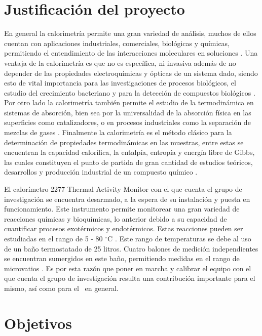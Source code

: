 \section{Justificación del proyecto}
	En general la calorimetría permite una gran variedad de análisis, muchos de ellos cuentan con aplicaciones industriales, comerciales, biológicas y químicas, permitiendo el entendimiento de las interacciones moleculares en soluciones \cite{blandamer1998titration}. Una ventaja de la calorimetría es que no es específica, ni invasiva además de no depender de las propiedades electroquímicas y ópticas de un sistema dado, siendo esto de vital importancia para las investigaciones de procesos biológicos, el estudio del crecimiento bacteriano y para la detección de compuestos biológicos \cite{winkelmann2004application}. Por otro lado la calorimetría también permite el estudio de la termodinámica en sistemas de absorción, bien sea por la universalidad de la absorción física en las superficies como catalizadores, o en procesos industriales como la separación de mezclas de gases \cite{morrison1987calorimetry}. Finalmente la calorimetría es el método clásico para la determinación de propiedades termodinámicas en las muestras, entre estas se encuentran la capacidad calorífica, la entalpía, entropía y energía libre de Gibbs, las cuales constituyen el punto de partida de gran cantidad de estudios teóricos, desarrollos y producción industrial de un compuesto químico \cite{wang2005determination, gaisford2016principles}.
	
	El calorímetro 2277 Thermal Activity Monitor con el que cuenta el grupo de investigación se encuentra desarmado, a la espera de su instalaci\'on y puesta en funcionamiento. Este instrumento permite monitorear una gran variedad de reacciones químicas y bioquímicas, lo anterior debido a su capacidad de cuantificar procesos exotérmicos y endotérmicos. Estas reacciones pueden ser estudiadas en el rango de 5 - 80 $^\circ$C \cite{Suurkuusk}. Este rango de temperaturas se debe al uso de un baño termostatado de 25 litros. Cuatro balones de medición independientes se encuentran sumergidos en este baño, permitiendo medidas en el rango de microvatios \cite{Suurkuusk}. Es por esta razón que poner en marcha y calibrar el equipo con el que cuenta el grupo de investigación resulta una contribución importante para el mismo, así como para el \deptname\ en general.
	
\section{Objetivos}
